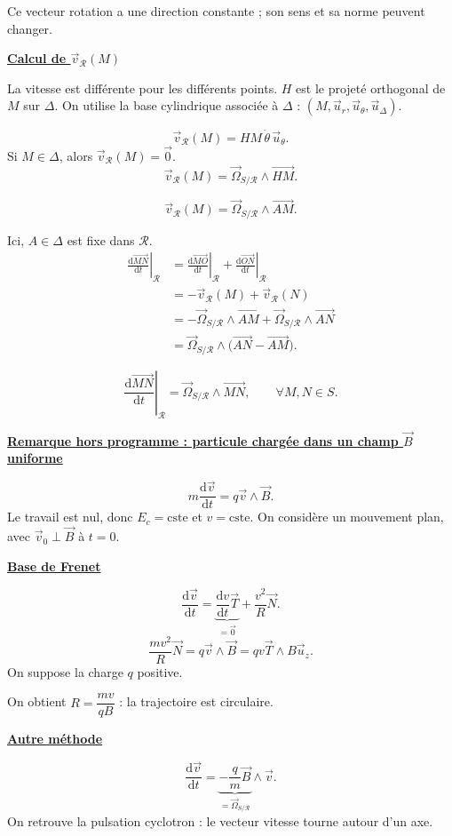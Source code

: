 \documentclass[11pt,a4paper]{article}
\newcommand{\dd}{\mathrm d}
\newcommand{\cste}{\mathrm{cste}}
\newcommand{\titr}[1]{\par\textbf{\underline{#1}}\par\nopagebreak[3]}
\newcommand{\R}{\mathcal R}
\newcommand{\Os}{\vec\Omega_{S/\R}}
\newcommand{\D}[2]{\left.\frac{\dd #1}{\dd t}\right|_{#2}}
\newcommand{\V}[1]{\vec v_{#1}}
\begin{document}
Ce vecteur rotation a une direction constante ; son sens et sa norme peuvent changer.
\titr{Calcul de $\V{\R}(M)$}
La vitesse est différente pour les différents points. $H$ est le projeté orthogonal de $M$ sur $\Delta$. On utilise la base cylindrique associée à $\Delta$ : $(M,\vec u_r,\vec u_\theta,\vec u_\Delta)$.
\begin{center}\end{center}
\[\V{\R}(M)=HM\,\dot\theta\,\vec u_\theta.\]
Si $M\in\Delta$, alors $\V{\R}(M)=\vec0$.
\[\V{\R}(M)=\Os\wedge\overrightarrow{HM}.\]
\begin{cadre}\[\V{\R}(M)=\Os\wedge\overrightarrow{AM}.\]\end{cadre}
Ici, $A\in\Delta$ est fixe dans $\R$.
\begin{align*}
\D{\overrightarrow{MN}}{\R}
&=\D{\overrightarrow{MO}}{\R}+\D{\overrightarrow{ON}}{\R}\\
&=-\V{\R}(M)+\V{\R}(N)\\
&=-\Os\wedge\overrightarrow{AM}+\Os\wedge\overrightarrow{AN}\\
&=\Os\wedge\bigl(\overrightarrow{AN}-\overrightarrow{AM}\bigr).
\end{align*}
\begin{cadre}\[\D{\overrightarrow{MN}}{\R}=\Os\wedge\overrightarrow{MN},\qquad\forall M,N\in S.\]\end{cadre}
\begin{exemple}[breakable]
\titr{Remarque hors programme : particule chargée dans un champ $\vec B$ uniforme}
\[m\frac{\dd\vec v}{\dd t}=q\vec v\wedge\vec B.\]
Le travail est nul, donc $E_c=\cste$ et $v=\cste$. On considère un mouvement plan, avec $\vec v_0\perp\vec B$ à $t=0$.
\titr{Base de Frenet}
\[\frac{\dd\vec v}{\dd t}=\underbrace{\frac{\dd v}{\dd t}\vec T}_{=\vec0}+\frac{v^2}{R}\vec N.\]
\[\frac{mv^2}{R}\vec N=q\vec v\wedge\vec B=qv\vec T\wedge B\vec u_z.\]
On suppose la charge $q$ positive.\par
On obtient $R=\dfrac{mv}{qB}$ : la trajectoire est circulaire.
\titr{Autre méthode}
\[\frac{\dd\vec v}{\dd t}=\underbrace{-\frac qm\vec B}_{=\Os}\wedge\vec v.\]
On retrouve la pulsation cyclotron : le vecteur vitesse tourne autour d'un axe.
\end{exemple}
\end{document}
